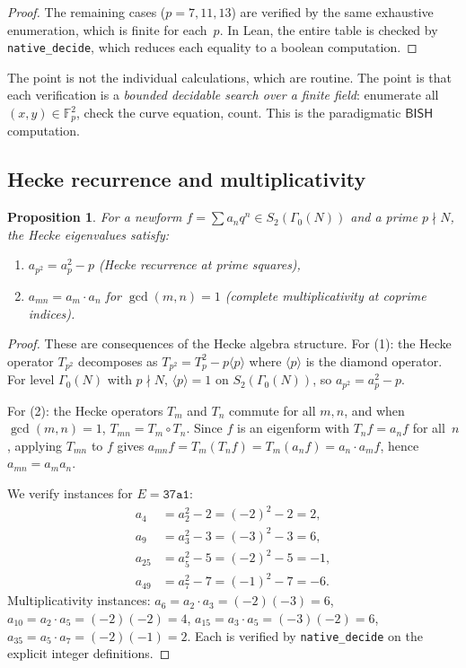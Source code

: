 \documentclass[11pt]{article}
\theoremstyle{plain}
\newtheorem{proposition}[theorem]{Proposition}
\theoremstyle{definition}
\theoremstyle{remark}
\newcommand{\F}{\mathbb{F}}
\newcommand{\BISH}{\ensuremath{\mathsf{BISH}}}
\begin{document}
\begin{proof}
The remaining cases ($p = 7, 11, 13$) are verified by the same exhaustive enumeration, which is finite for each~$p$. In Lean, the entire table is checked by \texttt{native\_decide}, which reduces each equality to a boolean computation.
\end{proof}

The point is not the individual calculations, which are routine. The point is that each verification is a \emph{bounded decidable search over a finite field}: enumerate all $(x, y) \in \F_p^2$, check the curve equation, count. This is the paradigmatic $\BISH$ computation.

\subsection{Hecke recurrence and multiplicativity}

\begin{proposition}\label{prop:hecke-recurrence}
For a newform $f = \sum a_n q^n \in S_2(\Gamma_0(N))$ and a prime $p \nmid N$, the Hecke eigenvalues satisfy:
\begin{enumerate}[nosep]
\item $a_{p^2} = a_p^2 - p$ \quad (Hecke recurrence at prime squares),
\item $a_{mn} = a_m \cdot a_n$ for $\gcd(m, n) = 1$ \quad (complete multiplicativity at coprime indices).
\end{enumerate}
\end{proposition}

\begin{proof}
These are consequences of the Hecke algebra structure. For (1): the Hecke operator $T_{p^2}$ decomposes as $T_{p^2} = T_p^2 - p\langle p \rangle$ where $\langle p \rangle$ is the diamond operator. For level $\Gamma_0(N)$ with $p \nmid N$, $\langle p \rangle = 1$ on $S_2(\Gamma_0(N))$, so $a_{p^2} = a_p^2 - p$.

For (2): the Hecke operators $T_m$ and $T_n$ commute for all $m, n$, and when $\gcd(m, n) = 1$, $T_{mn} = T_m \circ T_n$. Since $f$ is an eigenform with $T_n f = a_n f$ for all~$n$, applying $T_{mn}$ to $f$ gives $a_{mn} f = T_m(T_n f) = T_m(a_n f) = a_n \cdot a_m f$, hence $a_{mn} = a_m a_n$.

We verify instances for $E = \texttt{37a1}$:
\begin{align*}
a_4 &= a_2^2 - 2 = (-2)^2 - 2 = 2, \\
a_9 &= a_3^2 - 3 = (-3)^2 - 3 = 6, \\
a_{25} &= a_5^2 - 5 = (-2)^2 - 5 = -1, \\
a_{49} &= a_7^2 - 7 = (-1)^2 - 7 = -6.
\end{align*}
Multiplicativity instances: $a_6 = a_2 \cdot a_3 = (-2)(-3) = 6$, $a_{10} = a_2 \cdot a_5 = (-2)(-2) = 4$, $a_{15} = a_3 \cdot a_5 = (-3)(-2) = 6$, $a_{35} = a_5 \cdot a_7 = (-2)(-1) = 2$. Each is verified by \texttt{native\_decide} on the explicit integer definitions.
\end{proof}
\end{document}
